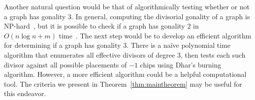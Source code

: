 \documentclass[ALCO,ThmDefs,Unicode,epreuves]{cedram}
\begin{document}
Another natural question would be that of algorithmically testing whether or not a graph has gonality $3$. In general, computing the divisorial gonality of a graph is NP-hard~\cite{gij}, but it is possible to check if a graph has gonality $2$ in $O(n \log n + m)$ time~\cite{recognize}. The next step would be to develop an efficient algorithm for determining if a graph has gonality $3$. There is a na\"{i}ve polynomial time algorithm that enumerates all effective divisors of degree $3$, then tests each such divisor against all possible placements of $-1$ chips using Dhar's burning algorithm. However, a more efficient algorithm could be a helpful computational tool. The criteria we present in Theorem~\ref{thm:maintheorem} may be useful for this endeavor.


 


\nocite{*}


\end{document}
